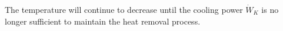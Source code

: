 The temperature will continue to decrease until the cooling power \( \dot{W}_K \) is no longer sufficient to maintain the heat removal process.